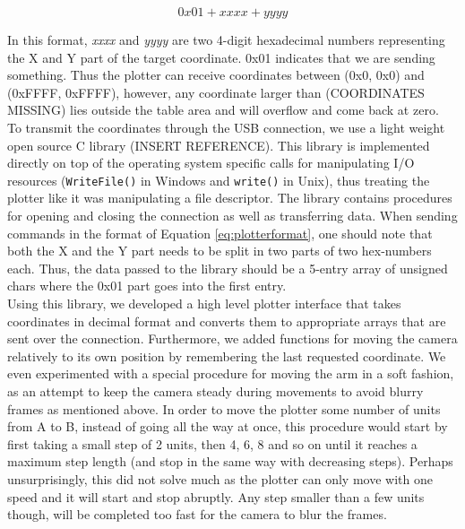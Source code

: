 \begin{center}
  \begin{equation}
  \label{eq:plotterformat}
    0x01 +  xxxx +  yyyy
  \end{equation}
\end{center}

In this format, \textit{xxxx} and \textit{yyyy} are two 4-digit hexadecimal numbers representing the X and Y part of the target coordinate. 0x01 indicates that we are sending something. Thus the plotter can receive coordinates between (0x0, 0x0) and (0xFFFF, 0xFFFF), however, any coordinate larger than (COORDINATES MISSING) lies outside the table area and will overflow and come back at zero. \\

To transmit the coordinates through the USB connection, we use a light weight open source C library (INSERT REFERENCE). This library is implemented directly on top of the operating system specific calls for manipulating I/O resources (\texttt{WriteFile()} in Windows and \texttt{write()} in Unix), thus treating the plotter like it was manipulating a file descriptor. The library contains procedures for opening and closing the connection as well as transferring data. When sending commands in the format of Equation \ref{eq:plotterformat}, one should note that both the X and the Y part needs to be split in two parts of two hex-numbers each. Thus, the data passed to the library should be a 5-entry array of unsigned chars where the 0x01 part goes into the first entry. \\

Using this library, we developed a high level plotter interface that takes coordinates in decimal format and converts them to appropriate arrays that are sent over the connection. Furthermore, we added functions for moving the camera relatively to its own position by remembering the last requested coordinate. We even experimented with a special procedure for moving the arm in a soft fashion, as an attempt to keep the camera steady during movements to avoid blurry frames as mentioned above. In order to move the plotter some number of units from A to B, instead of going all the way at once, this procedure would start by first taking a small step of 2 units, then 4, 6, 8 and so on until it reaches a maximum step length (and stop in the same way with decreasing steps). Perhaps unsurprisingly, this did not solve much as the plotter can only move with one speed and it will start and stop abruptly. Any step smaller than a few units though, will be completed too fast for the camera to blur the frames.

